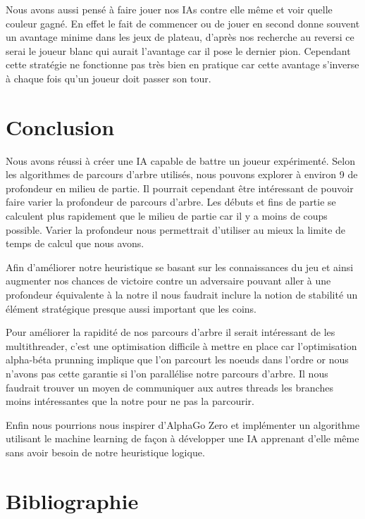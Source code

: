 \documentclass[12pt]{article}
\begin{document}
Nous avons aussi pensé à faire jouer nos IAs contre elle même et voir quelle couleur gagné. En effet le fait de commencer ou de jouer en second donne souvent un avantage minime dans les jeux de plateau, d'après nos recherche au reversi ce serai le joueur blanc qui aurait l'avantage car il pose le dernier pion. Cependant cette stratégie ne fonctionne pas très bien en pratique car cette avantage s'inverse à chaque fois qu'un joueur doit passer son tour.

\section{Conclusion}

Nous avons réussi à créer une IA capable de battre un joueur expérimenté. Selon les algorithmes de parcours d'arbre utilisés, nous pouvons explorer à environ 9 de profondeur en milieu de partie. Il pourrait cependant être intéressant de pouvoir faire varier la profondeur de parcours d'arbre. Les débuts et fins de partie se calculent plus rapidement que le milieu de partie car il y a moins de coups possible. Varier la profondeur nous permettrait d'utiliser au mieux la limite de temps de calcul que nous avons.

Afin d'améliorer notre heuristique se basant sur les connaissances du jeu et ainsi augmenter nos chances de victoire contre un adversaire pouvant aller à une profondeur équivalente à la notre il nous faudrait inclure la notion de stabilité un élément stratégique presque aussi important que les coins.

Pour améliorer la rapidité de nos parcours d'arbre il serait intéressant de les multithreader, c'est une optimisation difficile à mettre en place car l'optimisation alpha-béta prunning implique que l'on parcourt les noeuds dans l'ordre or nous n'avons pas cette garantie si l'on parallélise notre parcours d'arbre. Il nous faudrait trouver un moyen de communiquer aux autres threads les branches moins intéressantes que la notre pour ne pas la parcourir.

Enfin nous pourrions nous inspirer d'AlphaGo Zero et implémenter un algorithme utilisant le machine learning de façon à développer une IA apprenant d'elle même sans avoir besoin de notre heuristique logique.

\section{Bibliographie}



\end{document}
